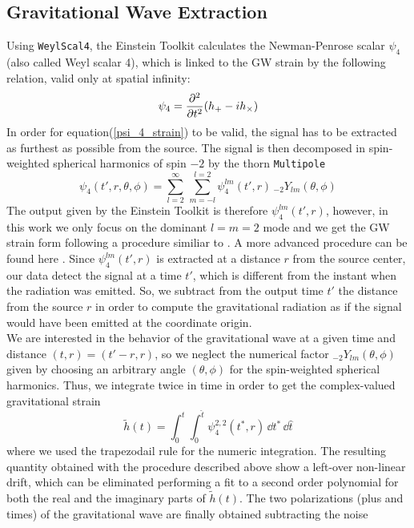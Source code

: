 \subsection{Gravitational Wave Extraction}
\label{gw_extraction}
Using \texttt{WeylScal4}, the Einstein Toolkit calculates the  Newman-Penrose scalar $\psi_4$ (also called Weyl scalar 4)\cite{newman_approach_1962}, which is linked to the GW strain by the following relation, valid only at spatial infinity:
\begin{equation}
\label{psi_4_strain}
\psi_{4} = \pdv[2]{}{t} \qty(h_{+} - i h_{\times})
\end{equation}
In order for equation(\ref{psi_4_strain}) to be valid, the signal has to be extracted as furthest as possible from the source.
The signal is then decomposed in spin-weighted spherical harmonics of spin $ - 2$ by the thorn \texttt{Multipole}\cite{thorne_multipole_1980}
\[
\psi_4 (t',r,\theta,\phi)= \sum_{l=2} ^{\infty} \, \sum _{m=-l} ^{l=2} \psi^{lm} _4 (t',r) \, _{-2} Y _{lm} (\theta, \phi) 
\]
The output given by the Einstein Toolkit is therefore $\psi_{4} ^{lm} (t',r)$, however, in this work we only focus on the dominant $l = m = 2$ mode and we get the GW strain form following a procedure similiar to \cite{de_pietri_modeling_2016}. A more advanced procedure can be found here \cite{maione_spectral_2017}. Since $\psi^{lm} _4 (t',r)$ is extracted at a distance $r$ from the source center,  our data detect the signal at a time $t'$, which is different from the instant when the radiation was emitted.
So, we subtract from the output time $t'$ the distance from the source $r$
in order to compute the gravitational radiation as if the signal would have been emitted at the coordinate origin.\\
We are interested in the behavior of the gravitational wave at a given time and distance $(t,r) = (t'-r,r)$, so we neglect the numerical factor $_{-2} Y _{lm} (\theta, \phi)$ given by choosing an arbitrary angle $(\theta,\phi)$ for the spin-weighted spherical harmonics.
Thus, we integrate twice in time in order to get the complex-valued gravitational strain
\[
\tilde{h}(t) = \int _0 ^{t} \int _0 ^{\hat{t}} \psi_4 ^{2,2} (t^{*},r)
\, \dd t^{*} \,  \dd \hat{t}
\]
where we used the trapezodail rule for the numeric integration.
The resulting quantity obtained with the procedure described above show a left-over non-linear drift, which can be eliminated  performing a fit to a second order polynomial for both the real and the imaginary parts of $\tilde{h}(t)$.
The two polarizations (plus and times) of the gravitational wave are finally obtained subtracting the noise
